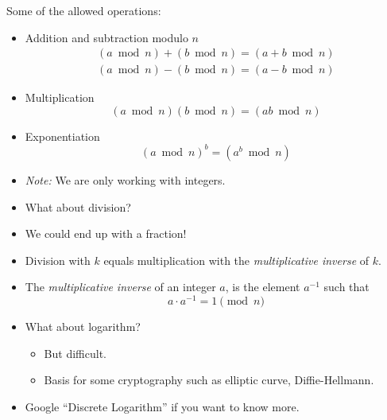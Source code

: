\documentclass[12pt,t]{beamer}
\newcommand{\bi}{\begin{itemize}}
\newcommand{\ei}{\end{itemize}}
\begin{document}
\begin{frame}
  \vspace{20pt}
  Some of the allowed operations:
  \bi
    \item Addition and subtraction modulo $n$
      \begin{align*}
        (a \bmod n) + (b \bmod n) = (a + b \bmod n) \\
        (a \bmod n) - (b \bmod n) = (a - b \bmod n)
      \end{align*}
    \item Multiplication
      \[
        (a \bmod n)(b \bmod n) = (ab \bmod n)
      \]
    \item Exponentiation
      \[
        (a \bmod n)^b = (a^b \bmod n)
      \]
    \item \emph{Note:} We are only working with integers.
  \ei
\end{frame}

\begin{frame}
  \vspace{40pt}
  \bi
    \item What about division? 
    \item We could end up with a fraction!
    \item Division with $k$ equals multiplication with the \emph{multiplicative
      inverse} of $k$.
    \item The \emph{multiplicative inverse} of an integer $a$, is the element $a^{-1}$ such that
      \[
        a \cdot a^{-1} = 1 \pmod{n}
      \]
  \ei
\end{frame}

\begin{frame}
  \vspace{40pt}
  \bi
    \item What about logarithm? 
      \bi
        \item But difficult.
        \item Basis for some cryptography such as elliptic curve, Diffie-Hellmann.
      \ei
    \item Google ``Discrete Logarithm'' if you want to know more.
  \ei
\end{frame}
\end{document}
